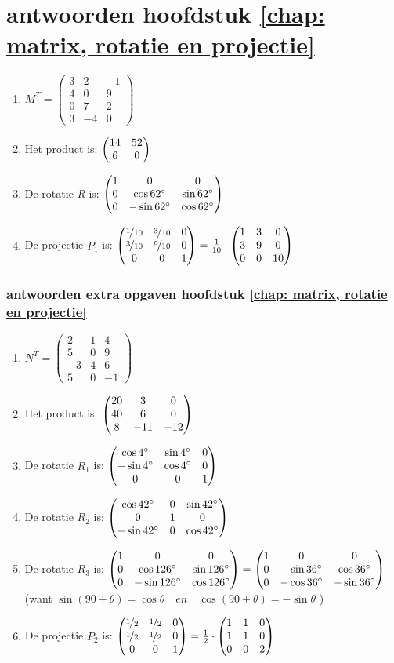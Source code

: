 \section{antwoorden  hoofdstuk \ref{chap: matrix, rotatie en projectie}}
\begin{enumerate}
	\item  
	$ M^{T} =	\begin{pmatrix}
	3 & 2 & -1\\
	4&0&9\\
	0&7&2\\
	3&-4&0 
	\end{pmatrix} $
	\item
	Het product is:  $ \begin{pmatrix} 14&52 \\ 6&0 \end{pmatrix}  $
	\item
	De rotatie \textit{R} is:  
	$ \begin{pmatrix} 1&0&0 \\ 0&\cos  62 \degree  & \sin 62 \degree \\ 0& -\sin 62 \degree & \cos 62 \degree \end{pmatrix}  $
	\item
	De projectie \textit{$P_1$} is:  
	$ \begin{pmatrix} \nicefrac{1}{10}&\nicefrac{3}{10}&0 \\ \nicefrac{3}{10}&\nicefrac{9}{10}  & 0 \\ 0& 0 & 1 \end{pmatrix}  
	= \frac{1}{10} \cdot\begin{pmatrix} 1&3&0 \\ 3&9  & 0 \\ 0& 0 & 10 \end{pmatrix} $    
	
\end{enumerate}

\subsubsection{antwoorden extra opgaven hoofdstuk \ref{chap: matrix, rotatie en projectie}}
\begin{enumerate}
	\item
	$ N^{T} =	\begin{pmatrix}
	2 & 1 & 4\\
	5&0&9\\
	-3&4&6\\
	5&0&-1 
	\end{pmatrix} $
	\item
	Het product is:  
	$ \begin{pmatrix} 20&3&0 \\ 40&6&0 \\ 8&-11&-12 \end{pmatrix} $
	\item    De rotatie   \textit{$ R_1  $}  is:  
	$ \begin{pmatrix} \cos  4 \degree  & \sin 4 \degree &0 \\  -\sin 4 \degree & \cos 4 \degree&0 \\ 0&0&1 \end{pmatrix} $
	\item De rotatie   \textit{$ R_2  $}  is:  
	$ \begin{pmatrix} \cos  42 \degree  & 0& \sin 42 \degree  \\ 0&1&0 \\  -\sin 42\degree &  0 &\cos 42 \degree \end{pmatrix} 
	$
	\item     De rotatie \textit{$ R_3  $} is:  
	$ \begin{pmatrix} 1&0&0 \\ 0&\cos  126 \degree  & \sin 126 \degree \\ 0& -\sin 126 \degree & \cos 126 \degree \end{pmatrix}  
	= \begin{pmatrix} 1&0&0 \\ 0&-\sin  36 \degree  & \cos 36 \degree \\ 0& -\cos 36 \degree & -\sin 36 \degree \end{pmatrix}  $ \\
	(want $ \sin(90+\theta)  = \cos \theta \quad en \quad \cos(90+\theta)  = -\sin \theta $ )
	\item   De projectie \textit{ $ P_2 $ } is:  
	$ \begin{pmatrix} \nicefrac{1}{2}&\nicefrac{1}{2}&0 \\ \nicefrac{1}{2}&\nicefrac{1}{2}  & 0 \\ 0& 0 & 1 \end{pmatrix}  
	= \frac{1}{2} \cdot\begin{pmatrix} 1&1&0 \\ 1&1  & 0 \\ 0& 0 & 2 \end{pmatrix} $    
	
\end{enumerate}

